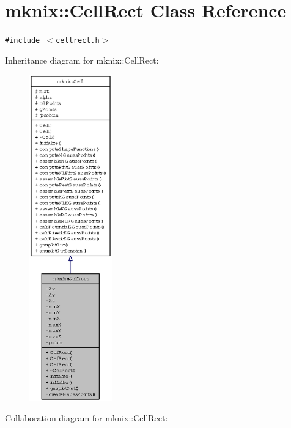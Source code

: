 \hypertarget{classmknix_1_1CellRect}{
\section{mknix::CellRect Class Reference}
\label{classmknix_1_1CellRect}
}
{\tt \#include $<$cellrect.h$>$}

Inheritance diagram for mknix::CellRect:\nopagebreak
\begin{figure}[H]
\begin{center}
\leavevmode
\includegraphics[height=400pt]{classmknix_1_1CellRect__inherit__graph}
\end{center}
\end{figure}
Collaboration diagram for mknix::CellRect:\nopagebreak
